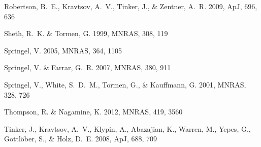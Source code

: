 \documentclass[useAMS, usenatbib]{mn2e}
\newcommand{\apj}{ApJ}
\newcommand{\mnras}{MNRAS}
\begin{document}
{\begin{thebibliography}{30}
{Robertson}, B.~E., {Kravtsov}, A.~V., {Tinker}, J., \& {Zentner}, A.~R. 2009,
  \apj, 696, 636

{Sheth}, R.~K. \& {Tormen}, G. 1999, \mnras, 308, 119

{Springel}, V. 2005, \mnras, 364, 1105

{Springel}, V. \& {Farrar}, G.~R. 2007, \mnras, 380, 911

{Springel}, V., {White}, S.~D.~M., {Tormen}, G., \& {Kauffmann}, G. 2001,
  \mnras, 328, 726

{Thompson}, R. \& {Nagamine}, K. 2012, \mnras, 419, 3560

{Tinker}, J., {Kravtsov}, A.~V., {Klypin}, A., {Abazajian}, K., {Warren}, M.,
  {Yepes}, G., {Gottl{\"o}ber}, S., \& {Holz}, D.~E. 2008, \apj, 688, 709

\end{thebibliography}
}
\end{document}
